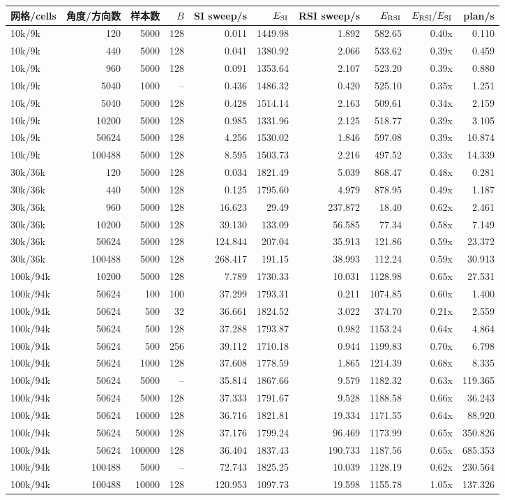 \documentclass[10pt]{article}
\begin{document}
{\scriptsize\setlength{\tabcolsep}{2pt}
\begin{tabular}{lrrrrrrrrr}
\toprule
网格/cells&角度/方向数&样本数&$B$&SI sweep/s&$E_{\rm SI}$&RSI sweep/s&$E_{\rm RSI}$&$E_{\rm RSI}/E_{\rm SI}$&plan/s\\
\midrule
10k/9k&120&5000&128&0.011&1449.98&1.892&582.65&0.40x&0.110\\
10k/9k&440&5000&128&0.041&1380.92&2.066&533.62&0.39x&0.459\\
10k/9k&960&5000&128&0.091&1353.64&2.107&523.20&0.39x&0.880\\
10k/9k&5040&1000&--&0.436&1486.32&0.420&525.10&0.35x&1.251\\
10k/9k&5040&5000&128&0.428&1514.14&2.163&509.61&0.34x&2.159\\
10k/9k&10200&5000&128&0.985&1331.96&2.125&518.77&0.39x&3.105\\
10k/9k&50624&5000&128&4.256&1530.02&1.846&597.08&0.39x&10.874\\
10k/9k&100488&5000&128&8.595&1503.73&2.216&497.52&0.33x&14.339\\
30k/36k&120&5000&128&0.034&1821.49&5.039&868.47&0.48x&0.281\\
30k/36k&440&5000&128&0.125&1795.60&4.979&878.95&0.49x&1.187\\
30k/36k&960&5000&128&16.623&29.49&237.872&18.40&0.62x&2.461\\
30k/36k&10200&5000&128&39.130&133.09&56.585&77.34&0.58x&7.149\\
30k/36k&50624&5000&128&124.844&207.04&35.913&121.86&0.59x&23.372\\
30k/36k&100488&5000&128&268.417&191.15&38.993&112.24&0.59x&30.913\\
100k/94k&10200&5000&128&7.789&1730.33&10.031&1128.98&0.65x&27.531\\
100k/94k&50624&100&100&37.299&1793.31&0.211&1074.85&0.60x&1.400\\
100k/94k&50624&500&32&36.661&1824.52&3.022&374.70&0.21x&2.559\\
100k/94k&50624&500&128&37.288&1793.87&0.982&1153.24&0.64x&4.864\\
100k/94k&50624&500&256&39.112&1710.18&0.944&1199.83&0.70x&6.798\\
100k/94k&50624&1000&128&37.608&1778.59&1.865&1214.39&0.68x&8.335\\
100k/94k&50624&5000&--&35.814&1867.66&9.579&1182.32&0.63x&119.365\\
100k/94k&50624&5000&128&37.333&1791.67&9.528&1188.58&0.66x&36.243\\
100k/94k&50624&10000&128&36.716&1821.81&19.334&1171.55&0.64x&88.920\\
100k/94k&50624&50000&128&37.176&1799.24&96.469&1173.99&0.65x&350.826\\
100k/94k&50624&100000&128&36.404&1837.43&190.733&1187.56&0.65x&685.353\\
100k/94k&100488&5000&--&72.743&1825.25&10.039&1128.19&0.62x&230.564\\
100k/94k&100488&10000&128&120.953&1097.73&19.598&1155.78&1.05x&137.326\\
\bottomrule
\end{tabular}}
\end{document}
